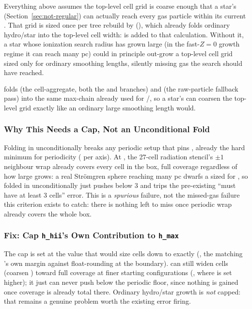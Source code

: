 Everything above assumes the top-level cell grid is coarse enough that
a star's  (Section~\ref{sec:not-regular}) can
actually reach every gas particle within its current . That
grid is sized once per tree rebuild by 
(), which already folds ordinary hydro/star
 into the top-level cell width:  is added to
that calculation. Without it, a star whose
ionization search radius has grown large (in the fast-$Z=0$ growth
regime it can reach many pc) could in
principle out-grow a top-level cell grid sized only for ordinary
smoothing lengths, silently missing gas the search should have reached.

 folds  (the
cell-aggregate, both the  and
 branches) and  (the
raw-particle fallback pass) into the same  max-chain
already used for /, so a star's
 can coarsen the top-level grid exactly like an ordinary
large smoothing length would.

\subsubsection{Why This Needs a Cap, Not an Unconditional Fold}

Folding
 in unconditionally breaks any periodic setup that pins
, already the hard minimum for
periodicity ( per axis).
At , the 27-cell radiation stencil's $\pm1$ neighbour
wrap already covers every cell in the box, full coverage regardless of
how large  grows: a real Str\"omgren sphere reaching many
pc dwarfs a  sized for , so 
folded in unconditionally just pushes  below 3 and trips the
pre-existing ``must have at least 3 cells'' error. This is a
\emph{spurious} failure, not the missed-gas failure this criterion exists to
catch: there is nothing left to miss once periodic wrap already covers
the whole box.

\subsubsection{Fix: Cap \texttt{h\_hii}'s Own Contribution to \texttt{h\_max}}

The cap is set
at the value that would size cells down to exactly 
(, the
 matching 's own  margin against
float-rounding at the boundary).  can still widen cells
(coarsen ) toward full coverage at finer starting
configurations (, where 
is set higher); it just can never push  below the periodic
floor, since nothing is gained once coverage is already total there.
Ordinary hydro/star  growth is \emph{not} capped: that
remains a genuine problem worth the existing error firing.

